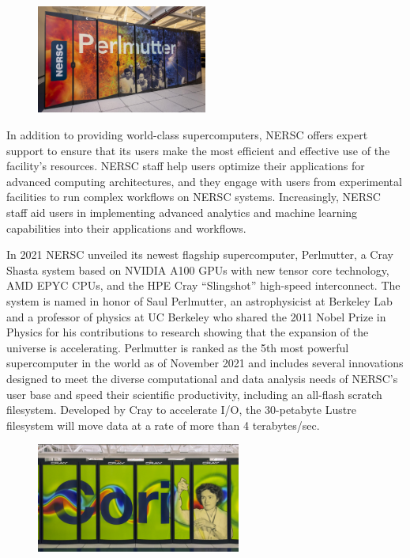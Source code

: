 \begin{figure}[h]
 \begin{center}
    \includegraphics[width=0.5\textwidth]
    {images/perlmutter.jpg}
 \end{center}
\end{figure}

In addition to providing world-class supercomputers, NERSC offers expert support to ensure that its users make the most efficient and effective use of the facility's resources. NERSC staff help users optimize their applications for advanced computing architectures, and they engage with users from experimental facilities to run complex workflows on NERSC systems. Increasingly, NERSC staff aid users in implementing advanced analytics and machine learning capabilities into their applications and workflows. 

In 2021 NERSC unveiled its newest flagship supercomputer, Perlmutter, a Cray Shasta system based on NVIDIA A100 GPUs with new tensor core technology, AMD EPYC CPUs, and the HPE Cray ``Slingshot'' high-speed interconnect. The system is named in honor of Saul Perlmutter, an astrophysicist at Berkeley Lab and a professor of physics at UC Berkeley who shared the 2011 Nobel Prize in Physics for his contributions to research showing that the expansion of the universe is accelerating. Perlmutter is ranked as the 5th most powerful supercomputer in the world as of November 2021 and includes several innovations designed to meet the diverse computational and data analysis needs of NERSC's user base and speed their scientific productivity, including  an all-flash scratch filesystem. Developed by Cray to accelerate I/O, the 30-petabyte Lustre filesystem will move data at a rate of more than 4 terabytes/sec. 

\begin{figure}[h]
 \begin{center}
    \includegraphics[width=0.6\textwidth]
    {images/cori.png}
 \end{center}
\end{figure}


